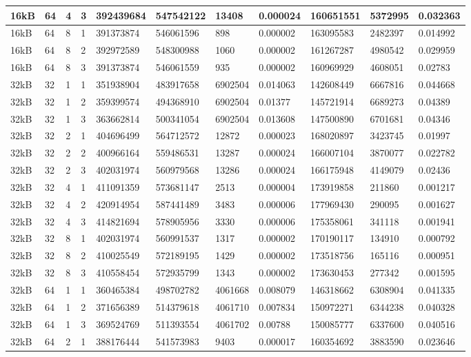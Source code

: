 \documentclass[conference]{IEEEtran}
\begin{document}
\begin{table}
\begin{tabular}{|m{.75cm} |m{.75cm} |m{.8cm} | m{.75cm} | l | l | l | l | l | l | l |}
        16kB&64&4&3&392439684&547542122&13408&0.000024&160651551&5372995&0.032363\\ \hline
        16kB&64&8&1&391373874&546061596&898&0.000002&163095583&2482397&0.014992\\ \hline
        16kB&64&8&2&392972589&548300988&1060&0.000002&161267287&4980542&0.029959\\ \hline
        16kB&64&8&3&391373874&546061559&935&0.000002&160969929&4608051&0.02783\\ \hline
        32kB&32&1&1&351938904&483917658&6902504&0.014063&142608449&6667816&0.044668\\ \hline
        32kB&32&1&2&359399574&494368910&6902504&0.01377&145721914&6689273&0.04389\\ \hline
        32kB&32&1&3&363662814&500341054&6902504&0.013608&147500890&6701681&0.04346\\ \hline
        32kB&32&2&1&404696499&564712572&12872&0.000023&168020897&3423745&0.01997\\ \hline
        32kB&32&2&2&400966164&559486531&13287&0.000024&166007104&3870077&0.022782\\ \hline
        32kB&32&2&3&402031974&560979568&13286&0.000024&166175948&4149079&0.02436\\ \hline
        32kB&32&4&1&411091359&573681147&2513&0.000004&173919858&211860&0.001217\\ \hline
        32kB&32&4&2&420914954&587441489&3483&0.000006&177969430&290095&0.001627\\ \hline
        32kB&32&4&3&414821694&578905956&3330&0.000006&175358061&341118&0.001941\\ \hline
        32kB&32&8&1&402031974&560991537&1317&0.000002&170190117&134910&0.000792\\ \hline
        32kB&32&8&2&410025549&572189195&1429&0.000002&173518756&165116&0.000951\\ \hline
        32kB&32&8&3&410558454&572935799&1343&0.000002&173630453&277342&0.001595\\ \hline
        32kB&64&1&1&360465384&498702782&4061668&0.008079&146318662&6308904&0.041335\\ \hline
        32kB&64&1&2&371656389&514379618&4061710&0.007834&150972271&6344238&0.040328\\ \hline
        32kB&64&1&3&369524769&511393554&4061702&0.00788&150085777&6337600&0.040516\\ \hline
        32kB&64&2&1&388176444&541573983&9403&0.000017&160354692&3883590&0.023646\\ \hline

\end{tabular}
\end{table}
\end{document}
